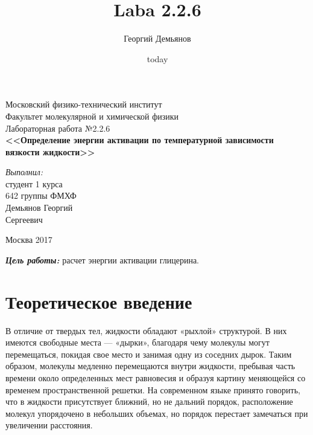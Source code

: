 \documentclass[a4paper,12pt]{article}
\title{Laba 2.2.6}
\author{Георгий Демьянов}
\date{today}
\begin{document}
 
\begin{titlepage}
\begin{center} 
 
\large Московский физико-технический институт\\
Факультет молекулярной и химической физики\\
\vspace{7cm}
\huge Лабораторная работа №2.2.6\\
\textbf{\Large <<Определение энергии активации по температурной зависимости вязкости жидкости>>}\\
\end{center} 

\vspace{7.5cm}
{\par \raggedleft \large \emph{Выполнил:}\\ студент 1 курса\\ 642 группы ФМХФ\\ Демьянов Георгий\\ Сергеевич \par}
\begin{center}
\vfill Москва 2017
\end{center}
\end{titlepage}

\newpage
\setcounter{page}{2}

\begin{center}
\end{center}

\textbf{\emph{Цель работы:}} расчет энергии активации глицерина.
\section{Теоретическое введение}
В отличие от твердых тел, жидкости обладают «рыхлой» структурой. В них имеются свободные места — «дырки», благодаря чему
молекулы могут перемещаться, покидая свое место и занимая одну
из соседних дырок. Таким образом, молекулы медленно перемещаются внутри жидкости, пребывая часть времени около определенных
мест равновесия и образуя картину меняющейся со временем пространственной решетки. На современном языке принято говорить, что в жидкости присутствует ближний, но не дальний порядок,
расположение молекул упорядочено в небольших объемах, но порядок перестает замечаться при увеличении расстояния.
\end{document}
